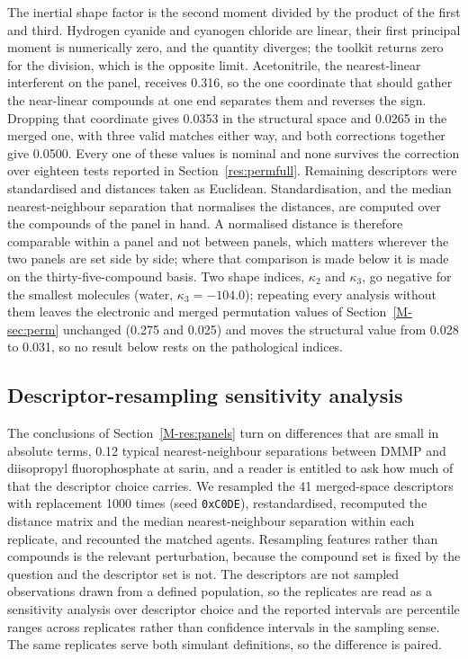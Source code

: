 \documentclass[11pt,a4paper]{article}
\begin{document}
The inertial shape factor is the second moment divided by the product of the
first and third. Hydrogen cyanide and cyanogen chloride are linear, their first
principal moment is numerically zero, and the quantity diverges; the toolkit
returns zero for the division, which is the opposite limit. Acetonitrile, the
nearest-linear interferent on the panel, receives 0.316, so the one coordinate
that should gather the near-linear compounds at one end separates them and
reverses the sign. Dropping that coordinate gives 0.0353 in the structural space
and 0.0265 in the merged one, with three valid matches either way, and both
corrections together give 0.0500. Every one of these values is nominal and none
survives the correction over eighteen tests reported in
Section~\ref{res:permfull}. Remaining descriptors were
standardised and distances taken as Euclidean. Standardisation, and the median
nearest-neighbour separation that normalises the distances, are computed over
the compounds of the panel in hand. A normalised distance is therefore
comparable within a panel and not between panels, which matters wherever the
two panels are set side by side; where that comparison is made below it is made
on the thirty-five-compound basis. Two shape indices, $\kappa_2$ and
$\kappa_3$, go negative for the smallest molecules (water,
$\kappa_3=-104.0$); repeating every analysis without them leaves the
electronic and merged permutation values of Section~\ref{M-sec:perm} unchanged
(0.275 and 0.025) and moves the structural value from 0.028 to 0.031, so no
result below rests on the pathological indices.

\subsection{Descriptor-resampling sensitivity analysis}
\label{meth:dboot}
The conclusions of Section~\ref{M-res:panels} turn on differences that are small
in absolute terms, 0.12 typical nearest-neighbour separations between DMMP and
diisopropyl fluorophosphate at sarin, and a reader is entitled to ask how much
of that the descriptor choice carries. We resampled the 41 merged-space
descriptors with replacement 1000 times (seed \texttt{0xC0DE}), restandardised,
recomputed the distance matrix and the median nearest-neighbour separation
within each replicate, and recounted the matched agents. Resampling features
rather than compounds is the relevant perturbation, because the compound set is
fixed by the question and the descriptor set is not. The descriptors are not
sampled observations drawn from a defined population, so the replicates are
read as a sensitivity analysis over descriptor choice and the reported
intervals are percentile ranges across replicates rather than confidence
intervals in the sampling sense. The same replicates serve
both simulant definitions, so the difference is paired.
\end{document}
